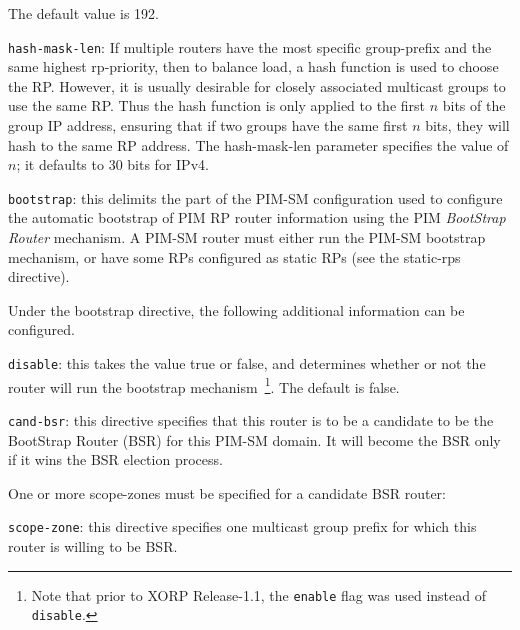 \begin{description}
\begin{description}
\begin{description}
\begin{description}
  The default value is 192.
\item{\tt hash-mask-len}: If multiple routers have the most specific
  {\stt group-prefix} and the same highest {\stt rp-priority}, then to
  balance load, a hash function is used to choose the RP.  However, it
  is usually desirable for closely associated multicast groups to use
  the same RP.  Thus the hash function is only applied to the first
  $n$ bits of the group IP address, ensuring that if two groups have
  the same first $n$ bits, they will hash to the same RP address.  The
  {\stt hash-mask-len} parameter specifies the value of $n$; it
  defaults to 30 bits for IPv4.
\end{description}
\end{description}
\end{description}
\item{\tt bootstrap}: this delimits the part of the PIM-SM
  configuration used to configure the automatic bootstrap of PIM RP
  router information using the PIM {\it BootStrap Router} mechanism.  A
  PIM-SM router must either run the PIM-SM bootstrap mechanism, or
  have some RPs configured as static RPs (see the {\stt static-rps}
  directive).

  Under the {\stt bootstrap} directive, the following additional
  information can be configured.
\begin{description}
\item{\tt disable}: this takes the value {\stt true} or {\stt false},
  and determines whether or not the router will run the {\stt
  bootstrap} mechanism~\footnote{Note
  that prior to XORP Release-1.1, the {\tt enable} flag was used instead of
  {\tt disable}.}.  The default is {\stt false}.
\item{\tt cand-bsr}: this directive specifies that this router is to
  be a candidate to be the BootStrap Router (BSR) for this PIM-SM domain.
  It will become the BSR only if it wins the BSR election process.

  One or more {\stt scope-zone}s must be specified for a candidate BSR
  router:
\begin{description}
\item{\tt scope-zone}: this directive specifies one multicast group
  prefix for which this router is willing to be BSR. 
 

\end{description}
\end{description}
\end{description}
